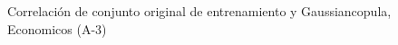 \begin{figure}[H]
    \centering
    
    \caption{Correlación de conjunto original de entrenamiento y Gaussiancopula, Economicos (A-3)}
    \label{pairwise-economicos-a-3-gaussiancopula}
\end{figure}